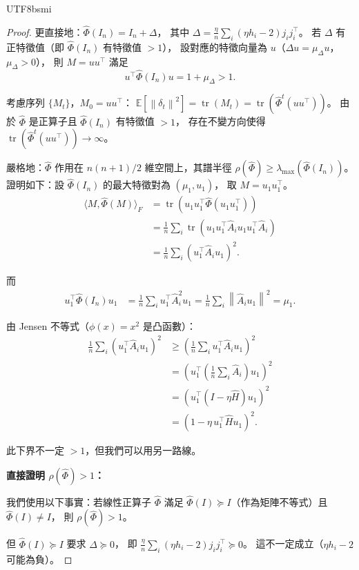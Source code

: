 \documentclass[11pt,a4paper]{article}
\theoremstyle{definition}
\DeclareMathOperator{\tr}{tr}
\newcommand{\E}{\mathbb{E}}
\newcommand{\norm}[1]{\left\|#1\right\|}
\begin{document}
\begin{CJK}{UTF8}{bsmi}
\begin{proof}
  更直接地：$\hat\Phi(I_n) = I_n + \Delta$，
  其中 $\Delta = \frac{\eta}{n}\sum_i(\eta h_i - 2)j_i j_i^\top$。
  若 $\Delta$ 有正特徵值（即 $\hat\Phi(I_n)$ 有特徵值 $> 1$），
  設對應的特徵向量為 $u$（$\Delta u = \mu_\Delta u$，$\mu_\Delta > 0$），
  則 $M = uu^\top$ 滿足
  \[
    u^\top\hat\Phi(I_n)u = 1 + \mu_\Delta > 1.
  \]

  考慮序列 $\{M_t\}$，$M_0 = uu^\top$：
  $\E[\norm{\delta_t}^2] = \tr(M_t) = \tr(\hat\Phi^t(uu^\top))$。
  由於 $\hat\Phi$ 是正算子且 $\hat\Phi(I_n)$ 有特徵值 $> 1$，
  存在不變方向使得 $\tr(\hat\Phi^t(uu^\top)) \to \infty$。

  嚴格地：$\hat\Phi$ 作用在 $n(n+1)/2$ 維空間上，其譜半徑
  $\rho(\hat\Phi) \geq \lambda_{\max}(\hat\Phi(I_n))$。
  證明如下：設 $\hat\Phi(I_n)$ 的最大特徵對為 $(\mu_1, u_1)$，
  取 $M = u_1 u_1^\top$。
  \begin{align*}
    \langle M, \hat\Phi(M)\rangle_F
    &= \tr(u_1 u_1^\top\hat\Phi(u_1 u_1^\top))\\
    &= \frac{1}{n}\sum_i \tr(u_1 u_1^\top\hat{A}_i u_1 u_1^\top\hat{A}_i)\\
    &= \frac{1}{n}\sum_i (u_1^\top\hat{A}_i u_1)^2.
  \end{align*}

  而
  \begin{align*}
    u_1^\top\hat\Phi(I_n)u_1
    &= \frac{1}{n}\sum_i u_1^\top\hat{A}_i^2 u_1
    = \frac{1}{n}\sum_i \norm{\hat{A}_i u_1}^2 = \mu_1.
  \end{align*}

  由 Jensen 不等式（$\phi(x) = x^2$ 是凸函數）：
  \begin{align*}
    \frac{1}{n}\sum_i (u_1^\top\hat{A}_i u_1)^2
    &\geq \left(\frac{1}{n}\sum_i u_1^\top\hat{A}_i u_1\right)^2\\
    &= \left(u_1^\top\left(\frac{1}{n}\sum_i\hat{A}_i\right)u_1\right)^2\\
    &= (u_1^\top(I - \eta\hat{H})u_1)^2\\
    &= (1 - \eta\,u_1^\top\hat{H}u_1)^2.
  \end{align*}

  此下界不一定 $> 1$，但我們可以用另一路線。

  \medskip
  \textbf{直接證明 $\rho(\hat\Phi) > 1$：}

  我們使用以下事實：若線性正算子 $\hat\Phi$ 滿足
  $\hat\Phi(I) \succeq I$（作為矩陣不等式）且 $\hat\Phi(I) \neq I$，
  則 $\rho(\hat\Phi) > 1$。

  但 $\hat\Phi(I) \succeq I$ 要求 $\Delta \succeq 0$，
  即 $\frac{\eta}{n}\sum_i(\eta h_i - 2)j_i j_i^\top \succeq 0$。
  這不一定成立（$\eta h_i - 2$ 可能為負）。


\end{proof}
\end{CJK}
\end{document}
